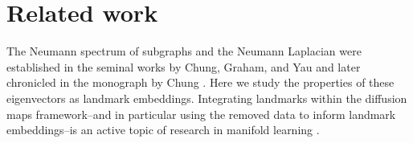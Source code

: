 \section{Related work}
The Neumann spectrum of subgraphs and the Neumann Laplacian were established in the seminal works by Chung, Graham, and Yau \cite{sgt1, sgt2, sgt3} and later chronicled in the monograph by Chung \cite{SGTbook}. Here we study the properties of these eigenvectors as landmark embeddings. Integrating landmarks within the diffusion maps framework--and in particular using the removed data to inform landmark embeddings--is an active topic of research in manifold learning \cite{landmark0, landmarkdmap1, landmarkdmap2, landmarkdmap3, landmarkdmap4, landmarkdmap5}.